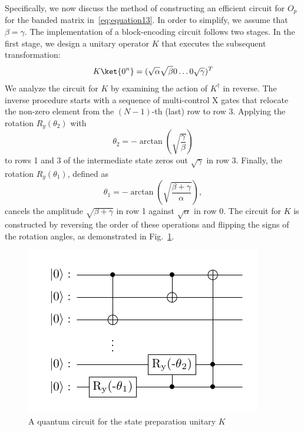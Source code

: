 \documentclass{article}
\begin{document}
    Specifically, we now discuss the method of constructing an efficient circuit for $O_p$ for the banded matrix in~\ref{eq:equation13}.
    In order to simplify, we assume that $\beta=\gamma$.
    The implementation of a block-encoding circuit follows two stages.
    In the first stage, we design a unitary operator $K$ that executes the subsequent transformation:
    \begin{equation}
        K\ket{0^n} = (\sqrt{\alpha}\sqrt{\beta}0\ldots0\sqrt{\gamma})^T\label{eq:equation27}
    \end{equation}
    We analyze the circuit for $ K $ by examining the action of $ K^\dagger $ in reverse. The inverse procedure starts with a sequence of multi-control X gates that relocate the non-zero element from the $ (N-1) $-th (last) row to row 3. Applying the rotation $ R_y(\theta_2) $ with
    \begin{equation}
    \theta_2 = -\arctan\left( \sqrt{\frac{\gamma}{\beta}} \right)
    \end{equation}
    to rows 1 and 3 of the intermediate state zeros out $ \sqrt{\gamma} $ in row 3. Finally, the rotation $ R_y(\theta_1) $, defined as
    \begin{equation}
    \theta_1 = -\arctan\left( \sqrt{\frac{\beta+\gamma}{\alpha}} \right),
    \end{equation}
    cancels the amplitude $ \sqrt{\beta+\gamma} $ in row 1 against $ \sqrt{\alpha} $ in row 0. The circuit for $ K $ is constructed by reversing the order of these operations and flipping the signs of the rotation angles, as demonstrated in Fig.~\ref{fig:K_circuit}.

    \begin{figure}[htbp]
        \centering
        \includegraphics{pdf/circuit_K}
        \caption{
            A quantum circuit for the state preparation unitary $K$
        }
        \label{fig:K_circuit}
    \end{figure}
\end{document}
